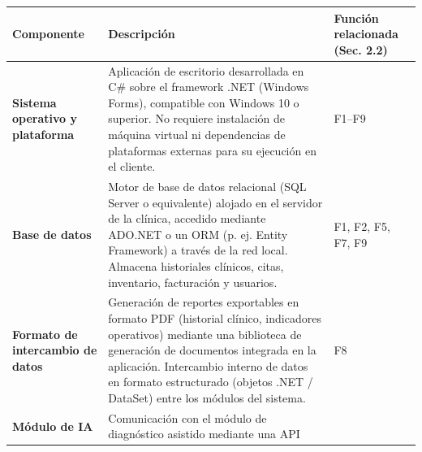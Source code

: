 \documentclass[
]{article}
\newcounter{none} %
\begin{document}
{\def\LTcaptype{none} %
\begin{longtable}[]{|
  >{\raggedright\arraybackslash}p{}|
  >{\raggedright\arraybackslash}p{}|
  >{\raggedright\arraybackslash}p{}|}
\hline
\begin{minipage}[b]{\linewidth}\raggedright
\textbf{Componente}
\end{minipage} & \begin{minipage}[b]{\linewidth}\raggedright
\textbf{Descripción}
\end{minipage} & \begin{minipage}[b]{\linewidth}\raggedright
\textbf{Función relacionada (Sec. 2.2)}
\end{minipage} \\
\hline
\endhead
\hline
\endlastfoot
\textbf{Sistema operativo y plataforma} &
\begin{minipage}[t]{\linewidth}\raggedright
Aplicación de escritorio desarrollada en C\# sobre el framework .NET (Windows Forms), compatible con Windows 10 o superior. No requiere
instalación de máquina virtual ni dependencias de plataformas externas
para su ejecución en el cliente.
\end{minipage} & F1--F9 \\
\hline
\textbf{Base de datos} & \begin{minipage}[t]{\linewidth}\raggedright
Motor de base de datos relacional (SQL Server o equivalente) alojado en
el servidor de la clínica, accedido mediante ADO.NET o un ORM (p. ej.
Entity Framework) a través de la red local. Almacena historiales
clínicos, citas, inventario, facturación y usuarios.
\end{minipage} & F1, F2, F5, F7, F9 \\
\hline
\textbf{Formato de intercambio de datos} &
\begin{minipage}[t]{\linewidth}\raggedright
Generación de reportes exportables en formato PDF (historial clínico,
indicadores operativos) mediante una biblioteca de generación de
documentos integrada en la aplicación. Intercambio interno de datos en formato estructurado (objetos .NET / DataSet) entre los módulos del sistema.
\end{minipage} & F8 \\
\hline
\textbf{Módulo de IA} & \begin{minipage}[t]{\linewidth}\raggedright
Comunicación con el módulo de diagnóstico asistido mediante una API

\end{minipage}
\end{longtable}}
\end{document}
